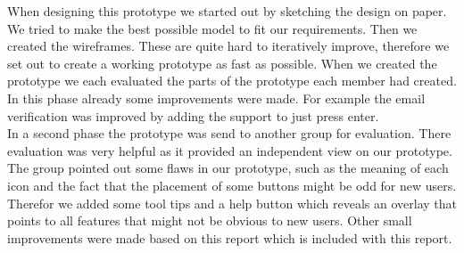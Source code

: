 When designing this prototype we started out by sketching the design on paper. We tried to make the best possible model to fit our requirements. Then we created the wireframes. These are quite hard to iteratively improve, therefore we set out to create a working prototype as fast as possible. When we created the prototype we each evaluated the parts of the prototype each member had created. In this phase already some improvements were made. For example the email verification was improved by adding the support to just press enter.\\
In a second phase the prototype was send to another group for evaluation. There evaluation was very helpful as it provided an independent view on our prototype. The group pointed out some flaws in our prototype, such as the meaning of each icon and the fact that the placement of some buttons might be odd for new users. Therefor we added some tool tips and a help button which reveals an overlay that points to all features that might not be obvious to new users. Other small improvements were made based on this report which is included with this report.
